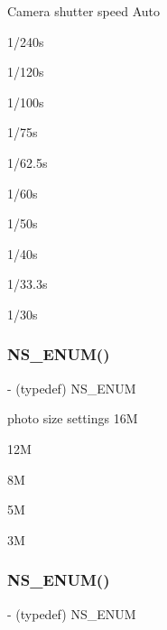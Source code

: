 Camera shutter speed Auto

1/240s

1/120s

1/100s

1/75s

1/62.\+5s

1/60s

1/50s

1/40s

1/33.\+3s

1/30s\mbox{\label{interface_p_v_camera_settings_def_ac284f9a2d42f5170be560e9677dffc41}} 
\subsubsection{\texorpdfstring{N\+S\+\_\+\+E\+N\+U\+M()}{NS\_ENUM()}\hspace{0.1cm}{\footnotesize\ttfamily [8/17]}}
{\footnotesize\ttfamily -\/ (typedef) N\+S\+\_\+\+E\+N\+UM \begin{DoxyParamCaption}\item[{(N\+S\+U\+Integer)}]{ }\item[{(P\+V\+Camera\+Photo\+Size)}]{ }\end{DoxyParamCaption}}

photo size settings 16M

12M

8M

5M

3M\mbox{\label{interface_p_v_camera_settings_def_ab1b046407fb33de544eee9c22438c62b}} 
\subsubsection{\texorpdfstring{N\+S\+\_\+\+E\+N\+U\+M()}{NS\_ENUM()}\hspace{0.1cm}{\footnotesize\ttfamily [9/17]}}
{\footnotesize\ttfamily -\/ (typedef) N\+S\+\_\+\+E\+N\+UM \begin{DoxyParamCaption}\item[{(N\+S\+U\+Integer)}]{ }\item[{(P\+V\+Eye\+Camera\+Photo\+Quality)}]{ }\end{DoxyParamCaption}}

